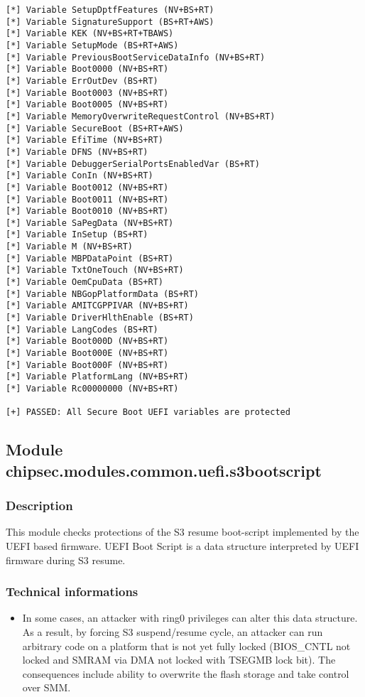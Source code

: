 \begin{verbatim}
[*] Variable SetupDptfFeatures (NV+BS+RT)
[*] Variable SignatureSupport (BS+RT+AWS)
[*] Variable KEK (NV+BS+RT+TBAWS)
[*] Variable SetupMode (BS+RT+AWS)
[*] Variable PreviousBootServiceDataInfo (NV+BS+RT)
[*] Variable Boot0000 (NV+BS+RT)
[*] Variable ErrOutDev (BS+RT)
[*] Variable Boot0003 (NV+BS+RT)
[*] Variable Boot0005 (NV+BS+RT)
[*] Variable MemoryOverwriteRequestControl (NV+BS+RT)
[*] Variable SecureBoot (BS+RT+AWS)
[*] Variable EfiTime (NV+BS+RT)
[*] Variable DFNS (NV+BS+RT)
[*] Variable DebuggerSerialPortsEnabledVar (BS+RT)
[*] Variable ConIn (NV+BS+RT)
[*] Variable Boot0012 (NV+BS+RT)
[*] Variable Boot0011 (NV+BS+RT)
[*] Variable Boot0010 (NV+BS+RT)
[*] Variable SaPegData (NV+BS+RT)
[*] Variable InSetup (BS+RT)
[*] Variable M (NV+BS+RT)
[*] Variable MBPDataPoint (BS+RT)
[*] Variable TxtOneTouch (NV+BS+RT)
[*] Variable OemCpuData (BS+RT)
[*] Variable NBGopPlatformData (BS+RT)
[*] Variable AMITCGPPIVAR (NV+BS+RT)
[*] Variable DriverHlthEnable (BS+RT)
[*] Variable LangCodes (BS+RT)
[*] Variable Boot000D (NV+BS+RT)
[*] Variable Boot000E (NV+BS+RT)
[*] Variable Boot000F (NV+BS+RT)
[*] Variable PlatformLang (NV+BS+RT)
[*] Variable Rc00000000 (NV+BS+RT)

[+] PASSED: All Secure Boot UEFI variables are protected
\end{verbatim}

\hypertarget{module-chipsec.modules.common.uefi.s3bootscript}{%
\subsection{Module
chipsec.modules.common.uefi.s3bootscript}\label{module-chipsec.modules.common.uefi.s3bootscript}}

\hypertarget{description-19}{%
\subsubsection{Description}\label{description-19}}

This module checks protections of the S3 resume boot-script implemented
by the UEFI based firmware. UEFI Boot Script is a data structure
interpreted by UEFI firmware during S3 resume.

\hypertarget{technical-informations-18}{%
\subsubsection{Technical informations}\label{technical-informations-18}}

\begin{itemize}
\tightlist
\item
  In some cases, an attacker with ring0 privileges can alter this data
  structure. As a result, by forcing S3 suspend/resume cycle, an
  attacker can run arbitrary code on a platform that is not yet fully
  locked (BIOS\_CNTL not locked and SMRAM via DMA not locked with TSEGMB
  lock bit). The consequences include ability to overwrite the flash
  storage and take control over SMM.
\end{itemize}

